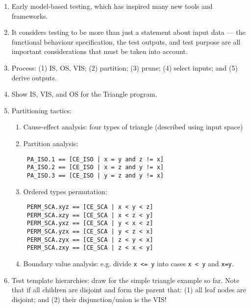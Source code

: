 \documentclass[11pt]{article}
\begin{document}
\begin{enumerate}

 \item Early model-based testing, which has inspired many new tools and frameworks.

 \item It considers testing to be more than just a statement about input data --- the functional behaviour specification, the test outputs, and test purpose are all important considerations that must be taken into account.

 \item Process: (1) IS, OS, VIS; (2) partition; (3) prune; (4) select inputs; and (5) derive outputs.

 \item Show IS, VIS, and OS for the Triangle program.

 \item Partitioning tactics:

  \begin{enumerate}

   \item Cause-effect analysis: four types of triangle (described using input space)

   \item Partition analysis: 

\lstset{aboveskip=3mm}
\lstset{language=alloy}
\begin{lstlisting}
 PA_ISO.1 == [CE_ISO | x = y and z != x]
 PA_ISO.2 == [CE_ISO | x = z and y != x]
 PA_ISO.3 == [CE_ISO | y = z and y != x]
\end{lstlisting}

   \item Ordered types permutation:

\lstset{aboveskip=3mm}
\lstset{language=alloy}
\begin{lstlisting}
 PERM_SCA.xyz == [CE_SCA | x < y < z]
 PERM_SCA.xzy == [CE_SCA | x < z < y]
 PERM_SCA.yxz == [CE_SCA | y < x < z]
 PERM_SCA.yzx == [CE_SCA | y < z < x]
 PERM_SCA.zyx == [CE_SCA | z < y < x]
 PERM_SCA.zxy == [CE_SCA | z < x < y]
\end{lstlisting}

   \item Boundary value analysis: e.g. divide \verb+x <= y+ into cases \verb+x < y+ and \verb+x=y+.

  \end{enumerate}

  \item Test template hierarchies: draw for the simple triangle example so far. Note that if all children are disjoint and form the parent that: (1) all leaf nodes are disjoint; and (2) their disjunction/union is the VIS!


\end{enumerate}
\end{document}
